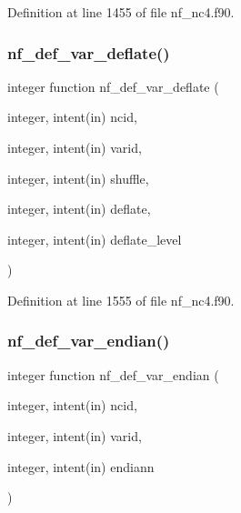 Definition at line 1455 of file nf\+\_\+nc4.\+f90.

\mbox{\label{nf__nc4_8f90_a134a9ce66ebe6114713e2a1b53b8fd5b}} 
\subsubsection{\texorpdfstring{nf\+\_\+def\+\_\+var\+\_\+deflate()}{nf\_def\_var\_deflate()}}
{\footnotesize\ttfamily integer function nf\+\_\+def\+\_\+var\+\_\+deflate (\begin{DoxyParamCaption}\item[{integer, intent(in)}]{ncid,  }\item[{integer, intent(in)}]{varid,  }\item[{integer, intent(in)}]{shuffle,  }\item[{integer, intent(in)}]{deflate,  }\item[{integer, intent(in)}]{deflate\+\_\+level }\end{DoxyParamCaption})}



Definition at line 1555 of file nf\+\_\+nc4.\+f90.

\mbox{\label{nf__nc4_8f90_a378de03b4286e054f0e58761bf3d9ee5}} 
\subsubsection{\texorpdfstring{nf\+\_\+def\+\_\+var\+\_\+endian()}{nf\_def\_var\_endian()}}
{\footnotesize\ttfamily integer function nf\+\_\+def\+\_\+var\+\_\+endian (\begin{DoxyParamCaption}\item[{integer, intent(in)}]{ncid,  }\item[{integer, intent(in)}]{varid,  }\item[{integer, intent(in)}]{endiann }\end{DoxyParamCaption})}



